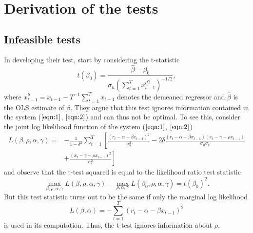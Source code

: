 \documentclass[11pt, a4paper]{article}
\begin{document}
\section{Derivation of the tests}
\label{Derivation of the tests}
\subsection{Infeasible tests}
\label{Infeasible tests}
In developing their test, \citet{campbell2006efficient} start by considering the t-statistic 
\begin{equation}
t\left(\beta_{0}\right)=\frac{\widehat{\beta}-\beta_{0}}{\sigma_{u}\left(\sum_{t=1}^{T} x_{t-1}^{\mu 2}\right)^{-1 / 2}},
\end{equation}
where $x_{t-1}^{\mu}=x_{t-1}-T^{-1} \sum_{t=1}^{T} x_{t-1}$ denotes the demeaned regressor and $\widehat{\beta}$ is the OLS estimate of $\beta$. They argue that this test ignores information contained in the system ($\ref{eqn:1}$, $\ref{eqn:2}$) and can thus not be optimal. To see this, consider the joint log likelihood function of the system ($\ref{eqn:1}$, $\ref{eqn:2}$)
\begin{equation}
\begin{aligned} L(\beta, \rho, \alpha, \gamma)=&-\frac{1}{1-\delta^{2}} \sum_{t=1}^{T}\left[\frac{\left(r_{t}-\alpha-\beta x_{t-1}\right)^{2}}{\sigma_{u}^{2}}-2 \delta \frac{\left(r_{t}-\alpha-\beta x_{t-1}\right)\left(x_{t}-\gamma-\rho x_{t-1}\right)}{\sigma_{u} \sigma_{e}}\right.\\ &\left.+\frac{\left(x_{t}-\gamma-\rho x_{t-1}\right)^{2}}{\sigma_{e}^{2}}\right] \end{aligned}
\end{equation}
and observe that the t-test squared is equal to the likelihood ratio test statistic
\begin{equation}
\max _{\beta, \rho, \alpha, \gamma} L(\beta, \rho, \alpha, \gamma)-\max _{\rho, \alpha, \gamma} L\left(\beta_{0}, \rho, \alpha, \gamma\right)=t\left(\beta_{0}\right)^{2}.
\end{equation}
But this test statistic turns out to be the same if only the marginal log likelihood 
\begin{equation}
L(\beta, \alpha)=-\sum_{t=1}^{T}\left(r_{t}-\alpha-\beta x_{t-1}\right)^{2}
\end{equation}
is used in its computation. Thus, the t-test ignores information about $\rho$.
\end{document}
